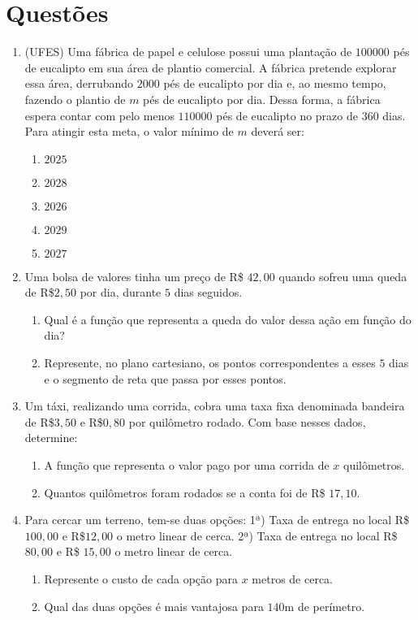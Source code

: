 \section{Questões}

 \begin{enumerate}
  \item (UFES) Uma fábrica de papel e celulose possui uma plantação de $100000$ pés de eucalipto em sua área de plantio comercial.
  A fábrica pretende explorar essa área, derrubando $2000$ pés de eucalipto por dia e, ao mesmo tempo, fazendo o plantio de $m$ pés
  de eucalipto por dia. Dessa forma, a fábrica espera contar com pelo menos $110000$ pés de eucalipto no prazo de $360$ dias.
  Para atingir esta meta, o valor mínimo de $m$ deverá ser:
  \begin{enumerate}
  \item $2025$
  \item $2028$
  \item $2026$
  \item $2029$
  \item $2027$
  \end{enumerate}

  \item Uma bolsa de valores tinha um preço de R\$ $42,00$ quando sofreu uma queda de R\$$2,50$ por dia, durante $5$ dias seguidos.
  \begin{enumerate}
  \item Qual é a função que representa a queda do valor dessa ação em função do dia?
  \item Represente, no plano cartesiano, os pontos correspondentes a esses $5$ dias e o segmento de reta que passa por esses pontos.
  \end{enumerate}

  \item Um táxi, realizando uma corrida, cobra uma taxa fixa denominada bandeira de R\$$3,50$ e R\$$0,80$ por quilômetro rodado.
  Com base nesses dados, determine:
  \begin{enumerate}
  \item A função que representa o valor pago por uma corrida de $x$ quilômetros.
  \item Quantos quilômetros foram rodados se a conta foi de R\$ $17,10$.
  \end{enumerate}

  \item Para cercar um terreno, tem-se duas opções:
  1ª) Taxa de entrega no local R\$ $100,00$ e R\$$12,00$ o metro linear de cerca.
  2ª) Taxa de entrega no local R\$ $80,00$ e R\$ $15,00$ o metro linear de cerca.
  \begin{enumerate}
  \item Represente o custo de cada opção para $x$ metros de cerca.
  \item Qual das duas opções é mais vantajosa para $140$m de perímetro.
  \end{enumerate}


\end{enumerate}
